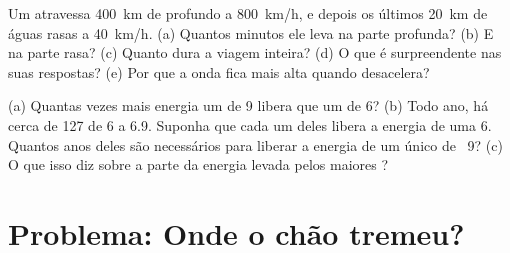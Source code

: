 \begin{exercise}[$\star\star\star$]\label{exo:g7:earthquakes:11}
Um  atravessa \qty{400}{km} de  profundo a \qty{800}{km/h},
e depois os últimos \qty{20}{km} de águas rasas a \qty{40}{km/h}.
(a) Quantos minutos ele leva na parte profunda? (b) E na parte rasa?
(c) Quanto dura a viagem inteira? (d) O que é surpreendente nas suas
respostas? (e) Por que a onda fica mais alta quando desacelera?
\end{exercise}

\begin{exercise}[$\star\star\star$]\label{exo:g7:earthquakes:12}
(a) Quantas vezes mais energia um  de  9 libera que um
de  6? (b) Todo ano, há cerca de 127  de  6 a
6.9. Suponha que cada um deles libera a energia de uma  6.
Quantos anos deles são necessários para liberar a energia de um único
 de ~9? (c) O que isso diz sobre a parte da energia
levada pelos maiores ?
\end{exercise}

\section{Problema: Onde o chão tremeu?}

